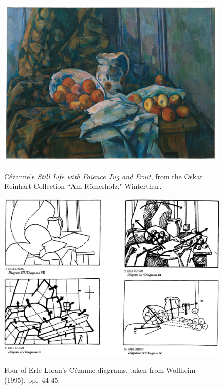 \begin{figure}
	\centering
	\caption{C\'{e}zanne's \emph{Still Life with Faience Jug and Fruit}, from the Oskar Reinhart Collection ``Am R\"{o}merholz," Winterthur.}
	\includegraphics[width=6.4in]{cezanne.png}
	\label{cezanne}
\end{figure}

\begin{figure}
	\centering
	\caption{Four of Erle Loran's C\'{e}zanne diagrams, taken from Wollheim (1995), pp.\ 44-45.}
	\includegraphics[width=6.4in]{loran_diagrams.png}
	\label{loran_diagrams}
\end{figure}

